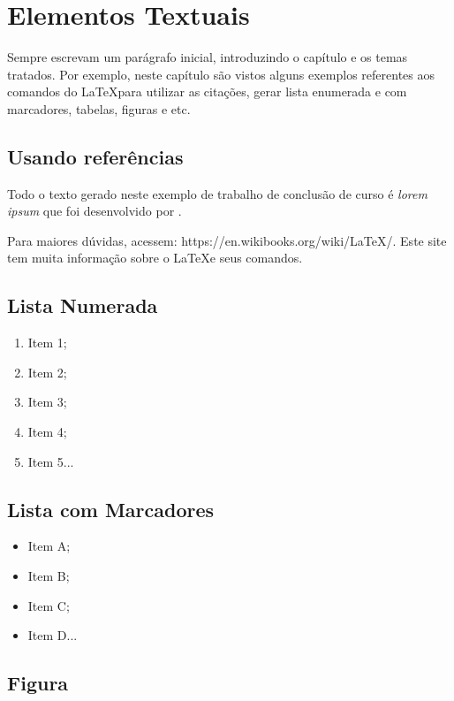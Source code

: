 \chapter{Elementos Textuais}

Sempre escrevam um parágrafo inicial, introduzindo o capítulo e os temas tratados. Por exemplo, neste capítulo são vistos alguns exemplos referentes aos comandos do \LaTeX  para utilizar as citações, gerar lista enumerada e com marcadores, tabelas, figuras e etc.

\section{Usando referências}

Todo o texto gerado neste exemplo de trabalho de conclusão de curso é \textit{lorem ipsum} que foi desenvolvido por \citeauthor{lipsum2014}. \cite{lipsum2014}

Para maiores dúvidas, acessem: https://en.wikibooks.org/wiki/LaTeX/. Este site tem muita informação sobre o \LaTeX  e seus comandos.

\lipsum[1]\cite{Yang2017}

\lipsum[1]\cite{alkassebeh2009}

\section{Lista Numerada}

\begin{enumerate}
 \item Item 1;
 \item Item 2;
 \item Item 3;
 \item Item 4;
 \item Item 5...
\end{enumerate}

\section{Lista com Marcadores}

\begin{itemize}
 \item Item A;
 \item Item B;
 \item Item C;
 \item Item D...
\end{itemize}

\section{Figura}


